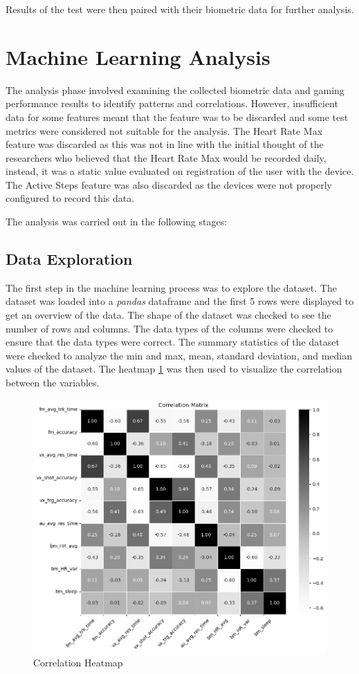 Results of the test were then paired with their biometric data for further analysis.


\section{Machine Learning Analysis}
The analysis phase involved examining the collected biometric data and gaming performance results to identify patterns and correlations. However, insufficient data for some
features meant that the feature was to be discarded and some test metrics were considered not suitable for the analysis. The Heart Rate Max feature was discarded
as this was not in line with the initial thought of the researchers who believed that the Heart Rate Max would be recorded daily, instead, it was a static value evaluated
on registration of the user with the device. The Active Steps feature was also discarded as the devices were not properly configured to record this data. 

The analysis was carried out in the following stages:

\subsection{Data Exploration}
The first step in the machine learning process was to explore the dataset. The dataset was loaded into a \textit{pandas} dataframe and the first 5 rows were displayed to get an overview of the
data. The shape of the dataset was checked to see the number of rows and columns. The data types of the columns were checked to ensure that the data types were correct. The summary
statistics of the dataset were checked to analyze the min and max, mean, standard deviation, and median values of the dataset. The heatmap \ref{fig:correlation_heatmap} was then used to
visualize the correlation between the variables.

\begin{figure}[H]
    \centering
    \includegraphics[width=1\textwidth]{images/regressionCharts/corr_matrix.png}
    \caption{Correlation Heatmap}
    \label{fig:correlation_heatmap}
\end{figure}

